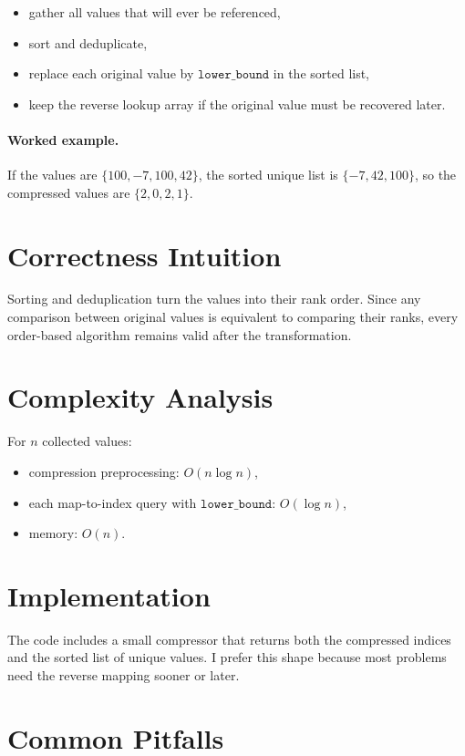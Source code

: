 \begin{itemize}
  \item gather all values that will ever be referenced,
  \item sort and deduplicate,
  \item replace each original value by \(\texttt{lower\_bound}\) in the sorted list,
  \item keep the reverse lookup array if the original value must be recovered later.
\end{itemize}

\paragraph{Worked example.}
If the values are \(\{100, -7, 100, 42\}\), the sorted unique list is \(\{-7, 42, 100\}\), so the compressed values
are \(\{2, 0, 2, 1\}\).

\section*{Correctness Intuition}

Sorting and deduplication turn the values into their rank order. Since any comparison between original values is
equivalent to comparing their ranks, every order-based algorithm remains valid after the transformation.

\section*{Complexity Analysis}

For \(n\) collected values:
\begin{itemize}
  \item compression preprocessing: \(O(n \log n)\),
  \item each map-to-index query with \(\texttt{lower\_bound}\): \(O(\log n)\),
  \item memory: \(O(n)\).
\end{itemize}

\section*{Implementation}

The code includes a small compressor that returns both the compressed indices and the sorted list of unique values. I
prefer this shape because most problems need the reverse mapping sooner or later.

\section*{Common Pitfalls}

